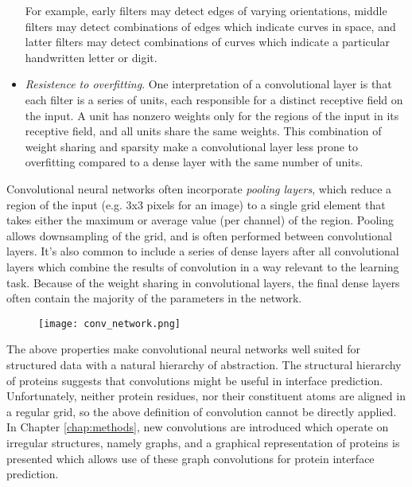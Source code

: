 \begin{itemize}
 	For example, early filters may detect edges of varying orientations, middle filters may detect combinations of edges which indicate curves in space, and latter filters may detect combinations of curves which indicate a particular handwritten letter or digit.
 	\item \textit{Resistence to overfitting}. 
 	One interpretation of a convolutional layer is that each filter is a series of units, each responsible for a distinct receptive field on the input.
 	A unit has nonzero weights only for the regions of the input in its receptive field, and all units share the same weights. 
 	This combination of weight sharing and sparsity make a convolutional layer less prone to overfitting compared to a dense layer with the same number of units.
 \end{itemize}

Convolutional neural networks often incorporate \textit{pooling layers}, which reduce a region of the input (e.g. 3x3 pixels for an image) to a single grid element that takes either the maximum or average value (per channel) of the region. 
Pooling allows downsampling of the grid, and is often performed between convolutional layers. 
It's also common to include a series of dense layers after all convolutional layers which combine the results of convolution in a way relevant to the learning task.
Because of the weight sharing in convolutional layers, the final dense layers often contain the majority of the parameters in the network.

\begin{figure}
	\centering
	\texttt{[image: conv\_network.png]}
	\caption{}
	\label{fig:conv_network}
\end{figure}


The above properties make convolutional neural networks well suited for structured data with a natural hierarchy of abstraction.
The structural hierarchy of proteins suggests that convolutions might be useful in interface prediction.
Unfortunately, neither protein residues, nor their constituent atoms are aligned in a regular grid, so the above definition of convolution cannot be directly applied. 
In Chapter \ref{chap:methods}, new convolutions are introduced which operate on irregular structures, namely graphs, and a graphical representation of proteins is presented which allows use of these graph convolutions for protein interface prediction.